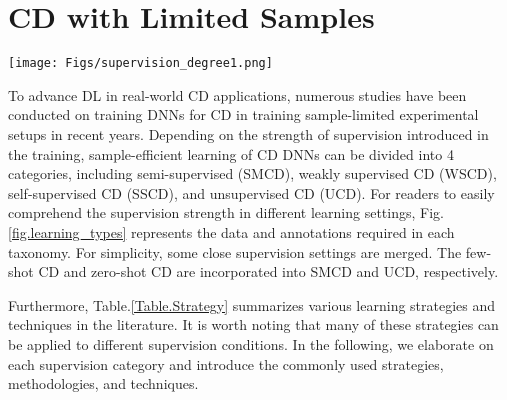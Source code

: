 \section{CD with Limited Samples} \label{sc3}

\begin{figure*}[t!]
	\begin{center}
        \texttt{[image: Figs/supervision\_degree1.png]}
	\end{center}
	\caption{Comparison of annotation and data volume in different CD learning paradigms.}
	\label{fig.learning_types}
\end{figure*}

To advance DL in real-world CD applications, numerous studies have been conducted on training DNNs for CD in training sample-limited experimental setups in recent years. Depending on the strength of supervision introduced in the training, sample-efficient learning of CD DNNs can be divided into 4 categories, including semi-supervised (SMCD), weakly supervised CD (WSCD), self-supervised CD (SSCD), and unsupervised CD (UCD). For readers to easily comprehend the supervision strength in different learning settings, Fig.\ref{fig.learning_types} represents the data and annotations required in each taxonomy. For simplicity, some close supervision settings are merged. The few-shot CD and zero-shot CD are incorporated into SMCD and UCD, respectively.

Furthermore, Table.\ref{Table.Strategy} summarizes various learning strategies and techniques in the literature. It is worth noting that many of these strategies can be applied to different supervision conditions. In the following, we elaborate on each supervision category and introduce the commonly used strategies, methodologies, and techniques.

